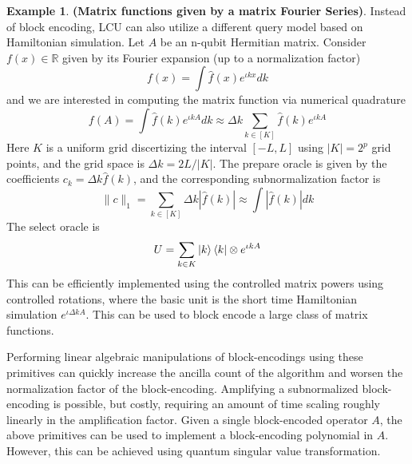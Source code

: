\documentclass[12pt, oneside]{book}
\theoremstyle{definition}
\theoremstyle{definition}
\newtheorem{example}{Example}[section]
\theoremstyle{remark}
\begin{document}
\begin{example}
    \textbf{(Matrix functions given by a matrix Fourier Series)}. Instead of block encoding, LCU can also utilize a different query model based on Hamiltonian simulation. Let $A$ be an n-qubit Hermitian matrix. Consider $f(x) \in \mathbb{R}$ given by its Fourier expansion (up to a normalization factor)
    \[
    f(x) = \int \hat{f}(x)e^{\iota kx}dk
    \]
    and we are interested in computing the matrix function via numerical quadrature
    \[
    f(A) = \int \hat{f}(k) e^{\iota kA} dk \approx \Delta k\sum_{k\in [K]} \hat{f}(k) e^{\iota kA}
    \]
    Here $K$ is a uniform grid discertizing the interval $[-L,L]$ using $|K|=2^p$ grid points, and the grid space is $\Delta k=2L/|K|$. The prepare oracle is given by the coefficients $c_k =\Delta k\hat{f}(k)$, and the corresponding subnormalization factor is
    \[
    \|c\|_1 =\sum_{k\in [K]} \Delta k|\hat{f}(k)| \approx \int |\hat{f}(k)|dk
    \]
    The select oracle is
    \[
    U=\sum_{k\in K} \ket{k}\bra{k}\otimes e^{\iota k A}
    \]
    This can be efficiently implemented using the controlled matrix powers using controlled rotations, where the basic unit is the short time Hamiltonian simulation $e^{\iota \Delta kA}$. This can be used to block encode a large class of matrix functions.
\end{example}

\begin{importantnote}
    Performing linear algebraic manipulations of block-encodings using these primitives can quickly increase the ancilla count of the algorithm and worsen the normalization factor of the block-encoding. Amplifying a subnormalized block-encoding is possible, but costly, requiring an amount of time scaling roughly linearly in the amplification factor. Given a single block-encoded operator $A$, the above primitives can be used to implement a block-encoding polynomial in $A$. However, this can be achieved using quantum singular value transformation.
\end{importantnote}
\end{document}
